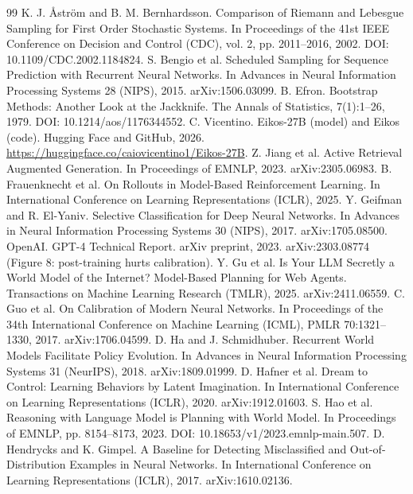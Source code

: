 \documentclass[11pt]{article}
\begin{document}
\begin{thebibliography}{99}\small
{} K. J. \AA{}str\"{o}m and B. M. Bernhardsson. Comparison of Riemann and Lebesgue Sampling for First Order Stochastic Systems. In Proceedings of the 41st IEEE Conference on Decision and Control (CDC), vol. 2, pp. 2011--2016, 2002. DOI: 10.1109/CDC.2002.1184824.
 S. Bengio et al. Scheduled Sampling for Sequence Prediction with Recurrent Neural Networks. In Advances in Neural Information Processing Systems 28 (NIPS), 2015. arXiv:1506.03099.
 B. Efron. Bootstrap Methods: Another Look at the Jackknife. The Annals of Statistics, 7(1):1--26, 1979. DOI: 10.1214/aos/1176344552.
 C. Vicentino. Eikos-27B (model) and Eikos (code). Hugging Face and GitHub, 2026. \url{https://huggingface.co/caiovicentino1/Eikos-27B}.
 Z. Jiang et al. Active Retrieval Augmented Generation. In Proceedings of EMNLP, 2023. arXiv:2305.06983.
 B. Frauenknecht et al. On Rollouts in Model-Based Reinforcement Learning. In International Conference on Learning Representations (ICLR), 2025.
 Y. Geifman and R. El-Yaniv. Selective Classification for Deep Neural Networks. In Advances in Neural Information Processing Systems 30 (NIPS), 2017. arXiv:1705.08500.
 OpenAI. GPT-4 Technical Report. arXiv preprint, 2023. arXiv:2303.08774 (Figure 8: post-training hurts calibration).
 Y. Gu et al. Is Your LLM Secretly a World Model of the Internet? Model-Based Planning for Web Agents. Transactions on Machine Learning Research (TMLR), 2025. arXiv:2411.06559.
 C. Guo et al. On Calibration of Modern Neural Networks. In Proceedings of the 34th International Conference on Machine Learning (ICML), PMLR 70:1321--1330, 2017. arXiv:1706.04599.
 D. Ha and J. Schmidhuber. Recurrent World Models Facilitate Policy Evolution. In Advances in Neural Information Processing Systems 31 (NeurIPS), 2018. arXiv:1809.01999.
 D. Hafner et al. Dream to Control: Learning Behaviors by Latent Imagination. In International Conference on Learning Representations (ICLR), 2020. arXiv:1912.01603.
 S. Hao et al. Reasoning with Language Model is Planning with World Model. In Proceedings of EMNLP, pp. 8154--8173, 2023. DOI: 10.18653/v1/2023.emnlp-main.507.
 D. Hendrycks and K. Gimpel. A Baseline for Detecting Misclassified and Out-of-Distribution Examples in Neural Networks. In International Conference on Learning Representations (ICLR), 2017. arXiv:1610.02136.

\end{thebibliography}
\end{document}
